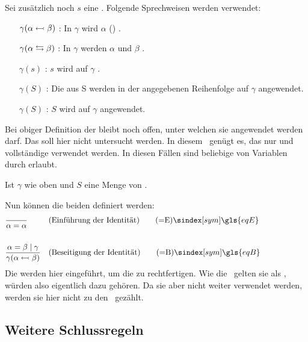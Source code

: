 {Sei zusätzlich noch $s$ eine .
Folgende Sprechweisen werden verwendet:
\begin{itemize}
	\renewcommand*{\itemindent}{1,5cm}
	\renewcommand*{\labelsep}{5pt}
	\item [$\gamma(\alpha \leftarrowtail \beta)$ :] In $\gamma$ wird $\alpha$ () .
	\item [$\gamma(\alpha \leftrightarrows \beta)$ :] In $\gamma$ werden $\alpha$ und $\beta$ .
	\item [$\gamma(s)$ :] $s$ wird auf $\gamma$ .
	\item [$\gamma(S)$ :] Die  aus S werden in der angegebenen Reihenfolge auf $\gamma$ angewendet.
	\item [$\gamma(S)$ :] $S$ wird auf $\gamma$ angewendet.
\end{itemize}
%
Bei obiger Definition der  bleibt noch offen, unter welchen  sie angewendet werden darf. Das soll hier nicht untersucht werden. In diesem \sectionname\ genügt es, das nur  und vollständige  verwendet werden.
In diesen Fällen sind beliebige  von Variablen durch  erlaubt.

Ist $\gamma$ wie oben und $S$ eine Menge von .

Nun können die beiden  definiert werden:
\begin{align}
	& \frac{}{\alpha\eq\alpha}
	& & (\text{Einführung der Identität})
	\tag{\tageqE} \sym{\gls{eqE}} \label{def:eqE}
	\\\\
	& \frac{\alpha\eq\beta \srand \gamma}{\gamma(\alpha\subst\beta)}
	& & (\text{Beseitigung der Identität})
	\tag{\tageqB} \sym{\gls{eqB}} \label{def:eqB}
	\formulatoleft
\end{align}
%
Die  werden hier eingeführt, um die  zu rechtfertigen.
Wie die \Basisregeln\ gelten sie als \Axiome, würden also eigentlich dazu gehören.
Da sie aber nicht weiter verwendet werden, werden sie hier nicht zu den \Basisregeln\ gezählt.

\subsection{Weitere Schlussregeln}%
\label{sub:weitereSchlussregeln}

}
